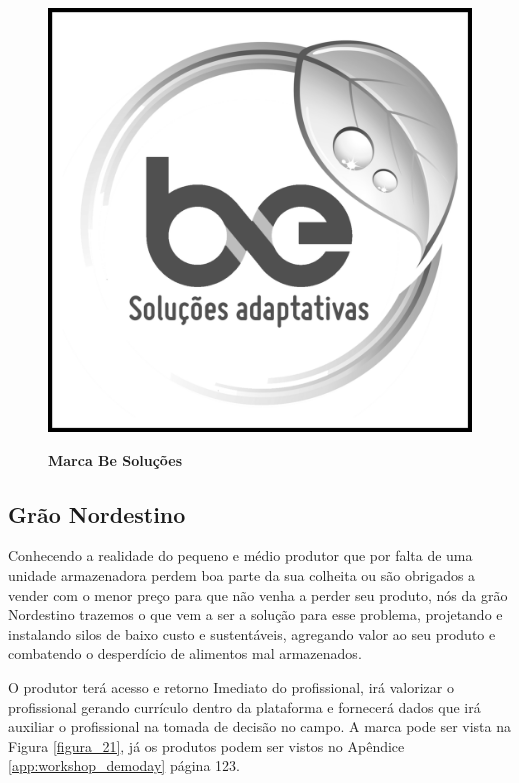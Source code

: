 \begin{figure}[H]
\centering
\caption{\textbf{Marca Be Soluções}}
\includegraphics[scale=0.11]{Imagens/besolucoes.png}
\label{figura_20}
\end{figure}




\subsection{Grão Nordestino}

Conhecendo a realidade do pequeno e médio produtor que por falta de uma unidade armazenadora perdem boa parte da sua colheita ou são obrigados a vender com o menor preço para que não venha a perder seu produto, nós da grão Nordestino trazemos o que vem a ser a solução para esse problema, projetando e instalando silos de baixo custo e sustentáveis, agregando valor ao seu produto e combatendo o desperdício de alimentos mal armazenados.

O produtor terá acesso e retorno Imediato do profissional, irá valorizar o profissional gerando currículo dentro da plataforma e fornecerá dados que irá auxiliar o profissional na tomada de decisão no campo. A marca pode ser vista na Figura \ref{figura_21}, já os produtos podem ser vistos no Apêndice \ref{app:workshop_demoday} página 123.


